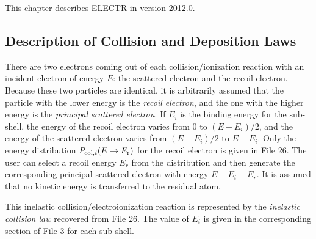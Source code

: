 \noindent This chapter describes ELECTR in version 2012.0.

\subsection{Description of Collision and Deposition Laws}
\label{ssELECTR_Desc}

There are two electrons coming out of each collision/ionization reaction with
an incident electron of energy $E$: the scattered electron and the recoil
electron. Because these two particles are identical, it is arbitrarily
assumed that the particle with the lower energy is the {\sl recoil electron},
and the one with the higher energy is the {\sl principal scattered electron}.
If $E_i$ is the binding energy for the sub-shell, the energy of the recoil
electron varies from 0 to $(E-E_i)/2$, and the energy of the scattered
electron varies from $(E-E_i)/2$ to $E-E_i$. Only the energy distribution
$P_{{\rm col},i}(E\rightarrow E_{\rm r})$ for the recoil electron is given
in File 26. The user can select a recoil energy $E_r$ from the distribution
and then generate the corresponding principal scattered electron with energy
$E-E_i-E_r$. It is assumed that no kinetic energy is transferred to the
residual atom.

This inelastic collision/electroionization reaction
 is represented by the {\sl inelastic collision
law} recovered from File 26. The value of $E_i$ is given
in the corresponding section of File 3 for each sub-shell.

